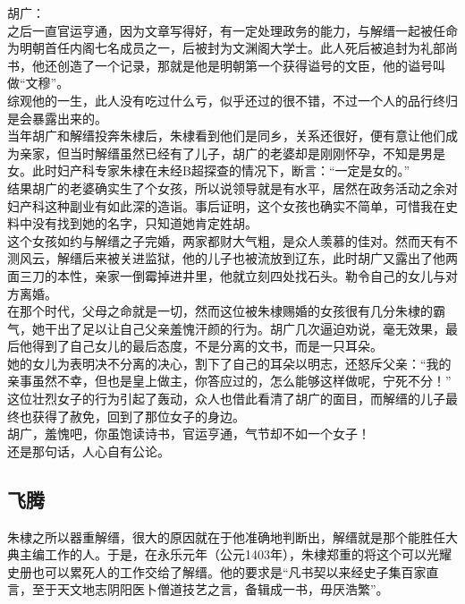 \begin{multicols}{\theparacolNo}
胡广：\\

之后一直官运亨通，因为文章写得好，有一定处理政务的能力，与解缙一起被任命为明朝首任内阁七名成员之一，后被封为文渊阁大学士。此人死后被追封为礼部尚书，他还创造了一个记录，那就是他是明朝第一个获得谥号的文臣，他的谥号叫做“文穆”。\\

综观他的一生，此人没有吃过什么亏，似乎还过的很不错，不过一个人的品行终归是会暴露出来的。\\

当年胡广和解缙投奔朱棣后，朱棣看到他们是同乡，关系还很好，便有意让他们成为亲家，但当时解缙虽然已经有了儿子，胡广的老婆却是刚刚怀孕，不知是男是女。此时妇产科专家朱棣在未经B超探查的情况下，断言：“一定是女的。”\\

结果胡广的老婆确实生了个女孩，所以说领导就是有水平，居然在政务活动之余对妇产科这种副业有如此深的造诣。事后证明，这个女孩也确实不简单，可惜我在史料中没有找到她的名字，只知道她肯定姓胡。\\

这个女孩如约与解缙之子完婚，两家都财大气粗，是众人羡慕的佳对。然而天有不测风云，解缙后来被关进监狱，他的儿子也被流放到辽东，此时胡广又露出了他两面三刀的本性，亲家一倒霉掉进井里，他就立刻四处找石头。勒令自己的女儿与对方离婚。\\

在那个时代，父母之命就是一切，然而这位被朱棣赐婚的女孩很有几分朱棣的霸气，她干出了足以让自己父亲羞愧汗颜的行为。胡广几次逼迫劝说，毫无效果，最后他得到了自己女儿的最后态度，不是分离的文书，而是一只耳朵。\\

她的女儿为表明决不分离的决心，割下了自己的耳朵以明志，还怒斥父亲：“我的亲事虽然不幸，但也是皇上做主，你答应过的，怎么能够这样做呢，宁死不分！”\\

这位壮烈女子的行为引起了轰动，众人也借此看清了胡广的面目，而解缙的儿子最终也获得了赦免，回到了那位女子的身边。\\

胡广，羞愧吧，你虽饱读诗书，官运亨通，气节却不如一个女子！\\

还是那句话，人心自有公论。\\

\subsection{飞腾}
朱棣之所以器重解缙，很大的原因就在于他准确地判断出，解缙就是那个能胜任大典主编工作的人。于是，在永乐元年（公元1403年），朱棣郑重的将这个可以光耀史册也可以累死人的工作交给了解缙。他的要求是“凡书契以来经史子集百家直言，至于天文地志阴阳医卜僧道技艺之言，备辑成一书，毋厌浩繁”。\\


\end{multicols}
